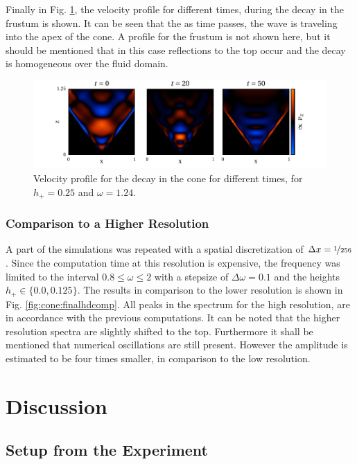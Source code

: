 Finally in Fig. \ref{fig:cone:decayphaseexample}, the velocity profile for different times, during the decay in
the frustum is shown.
It can be seen that the as time passes, the wave is traveling into the apex of the cone.
A profile for the frustum is not shown here, but it should be mentioned that in this case reflections to the top occur
and the decay is homogeneous over the fluid domain.

\begin{figure}[!b]
  \centering
  \includegraphics{gfx/cone/final/decay/phase_decay.pdf}
  \caption{
      \label{fig:cone:decayphaseexample}
        Velocity profile for the decay in the cone for different times, for $h_+=0.25$ and $\omega=1.24$.
    }
\end{figure}

\subsubsection{Comparison to a Higher Resolution}

A part of the simulations was repeated with a spatial discretization of $\Delta x= \nicefrac{1}{256}$.
Since the computation time at this resolution is expensive, the frequency was limited
to the interval $0.8\leq\omega\leq2$ with a stepsize of $\Delta \omega = 0.1$ and the heights
$h_+\in\{0.0, 0.125\}$.
The results in comparison to the lower resolution is shown in Fig. \ref{fig:cone:finalhdcomp}.
All peaks in the spectrum for the high resolution, are in accordance with the previous computations.
It can be noted that the higher resolution spectra are slightly shifted to the top.
Furthermore it shall be mentioned that numerical oscillations  are still present.
However the amplitude is estimated to be four times smaller, in comparison to the low resolution.


\clearpage

\section{Discussion}
\subsection{Setup from the Experiment}

